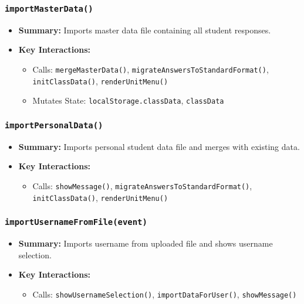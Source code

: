 \documentclass[11pt,letterpaper]{article}
\begin{document}
\subsubsection{\texttt{importMasterData()}}
\begin{itemize}
    \item \textbf{Summary:} Imports master data file containing all student responses.
    \item \textbf{Key Interactions:}
    \begin{itemize}
        \item Calls: \texttt{mergeMasterData()}, \texttt{migrateAnswersToStandardFormat()}, \texttt{initClassData()}, \texttt{renderUnitMenu()}
        \item Mutates State: \texttt{localStorage.classData}, \texttt{classData}
    \end{itemize}
\end{itemize}

\subsubsection{\texttt{importPersonalData()}}
\begin{itemize}
    \item \textbf{Summary:} Imports personal student data file and merges with existing data.
    \item \textbf{Key Interactions:}
    \begin{itemize}
        \item Calls: \texttt{showMessage()}, \texttt{migrateAnswersToStandardFormat()}, \texttt{initClassData()}, \texttt{renderUnitMenu()}
    \end{itemize}
\end{itemize}

\subsubsection{\texttt{importUsernameFromFile(event)}}
\begin{itemize}
    \item \textbf{Summary:} Imports username from uploaded file and shows username selection.
    \item \textbf{Key Interactions:}
    \begin{itemize}
        \item Calls: \texttt{showUsernameSelection()}, \texttt{importDataForUser()}, \texttt{showMessage()}
    \end{itemize}
\end{itemize}
\end{document}
